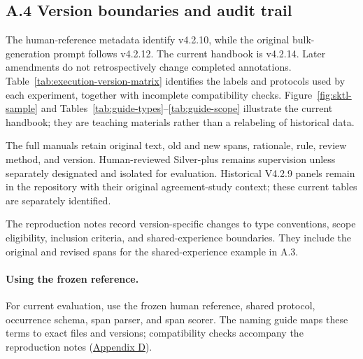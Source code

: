 \subsection{A.4 Version boundaries and audit trail}
\label{sec:guide-version-history}

The human-reference metadata identify v4.2.10, while the original bulk-generation prompt follows v4.2.12. The current handbook is v4.2.14. Later amendments do not retrospectively change completed annotations. Table~\ref{tab:execution-version-matrix} identifies the labels and protocols used by each experiment, together with incomplete compatibility checks. Figure~\ref{fig:sktl-sample} and Tables~\ref{tab:guide-types}--\ref{tab:guide-scope} illustrate the current handbook; they are teaching materials rather than a relabeling of historical data.



\FloatBarrier
{}

The full manuals retain original text, old and new spans, rationale, rule, review method, and version. Human-reviewed Silver-plus remains supervision unless separately designated and isolated for evaluation. Historical V4.2.9 panels remain in the repository with their original agreement-study context; these current tables are separately identified.




The reproduction notes record version-specific changes to type conventions, scope eligibility, inclusion criteria, and shared-experience boundaries. They include the original and revised spans for the shared-experience example in A.3.

\paragraph{Using the frozen reference.}
For current evaluation, use the frozen human reference, shared protocol, occurrence schema, span parser, and span scorer. The naming guide maps these terms to exact files and versions; compatibility checks accompany the reproduction notes (\hyperref[app:d]{Appendix D}).

